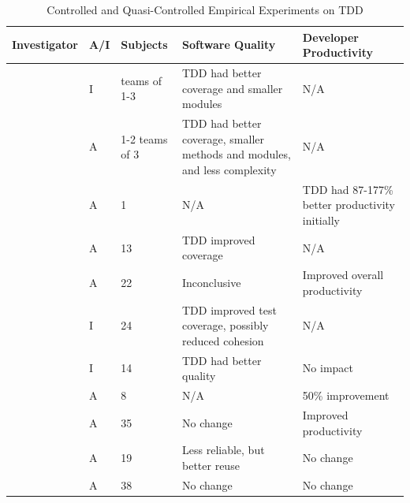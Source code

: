 \documentclass[smallextended]{svjour3}     %
\begin{document}
\begin{table}[ht]
\caption{Controlled and Quasi-Controlled Empirical Experiments on TDD}
\begin{tabular}{|p{1.0in}|l|l|p{1.0in}|p{1.0in}|} \hline 
Investigator      & A/I & Subjects	& Software Quality	& Developer Productivity \\ \hline
\cite{Janzen:08}  & I & teams of 1-3 & TDD had better  coverage and smaller modules & N/A \\ \hline
\cite{Janzen:08}  & A & 1-2 teams of 3 & TDD had better coverage, smaller methods and modules, and less complexity &  N/A \\ \hline
\cite{Madeyski:07}  & A & 1	& N/A & TDD had 87-177\% better productivity initially  \\ \hline
\cite{Siniaalto:07}  & A & 13	& TDD improved coverage & N/A \\ \hline
\cite{Gupta:07}  & A & 22	& Inconclusive & Improved overall productivity \\ \hline
\cite{George:04}  & I & 24	& TDD improved test coverage, possibly reduced cohesion & N/A \\ \hline
\cite{Geras:04}   & I & 14	& TDD had better quality & No impact \\ \hline 
\cite{Kaufmann:03}& A &  8 & N/A	    & 50\% improvement \\ \hline
\cite{Erdogmus:05}& A & 35	& No change	  & Improved productivity \\ \hline
\cite{Muller:02}  & A & 19 & Less reliable, but better reuse	& No change \\ \hline
\cite{Matjaz:03}  & A & 38	& No change	  & No change \\ \hline
\end{tabular}
\label{tab:ControlledTDDResearch}
\end{table}
\end{document}
